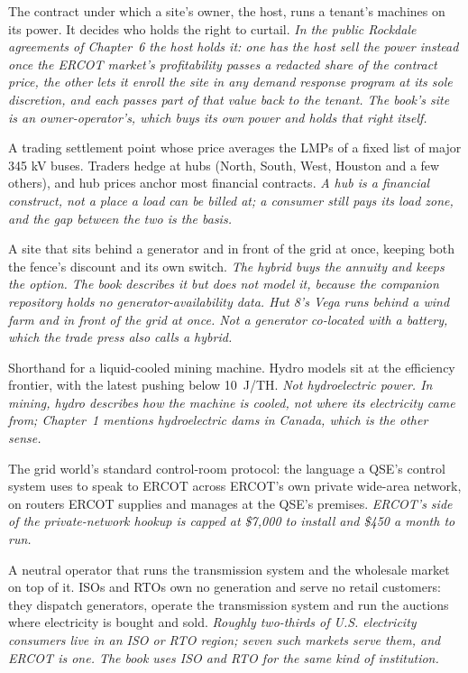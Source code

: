 \begin{description}[leftmargin=0pt,style=unboxed,itemsep=0.35em,parsep=0.15em]
\item[hosting agreement] \hypertarget{glossary:hosting-agreement}{}The contract under which a site's owner, the host, runs a tenant's machines on its power. It decides who holds the right to curtail. \emph{In the public Rockdale agreements of Chapter~6 the host holds it: one has the host sell the power instead once the ERCOT market's profitability passes a redacted share of the contract price, the other lets it enroll the site in any demand response program at its sole discretion, and each passes part of that value back to the tenant. The book's site is an owner-operator's, which buys its own power and holds that right itself.}
\item[hub] \hypertarget{glossary:hub}{}A trading settlement point whose price averages the LMPs of a fixed list of major 345 kV buses. Traders hedge at hubs (North, South, West, Houston and a few others), and hub prices anchor most financial contracts. \emph{A hub is a financial construct, not a place a load can be billed at; a consumer still pays its load zone, and the gap between the two is the basis.}
\item[hybrid] \hypertarget{glossary:hybrid}{}A site that sits behind a generator and in front of the grid at once, keeping both the fence's discount and its own switch. \emph{The hybrid buys the annuity and keeps the option. The book describes it but does not model it, because the companion repository holds no generator-availability data. Hut 8's Vega runs behind a wind farm and in front of the grid at once. Not a generator co-located with a battery, which the trade press also calls a hybrid.}
\item[hydro] \hypertarget{glossary:hydro}{}Shorthand for a liquid-cooled mining machine. Hydro models sit at the efficiency frontier, with the latest pushing below 10~J/TH. \emph{Not hydroelectric power. In mining, hydro describes how the machine is cooled, not where its electricity came from; Chapter~1 mentions hydroelectric dams in Canada, which is the other sense.}
\item[ICCP] \hypertarget{glossary:iccp}{}The grid world's standard control-room protocol: the language a QSE's control system uses to speak to ERCOT across ERCOT's own private wide-area network, on routers ERCOT supplies and manages at the QSE's premises. \emph{ERCOT's side of the private-network hookup is capped at \$7,000 to install and \$450 a month to run.}
\item[Independent System Operator (ISO)] \hypertarget{glossary:independent-system-operator}{}A neutral operator that runs the transmission system and the wholesale market on top of it. ISOs and RTOs own no generation and serve no retail customers: they dispatch generators, operate the transmission system and run the auctions where electricity is bought and sold. \emph{Roughly two-thirds of U.S. electricity consumers live in an ISO or RTO region; seven such markets serve them, and ERCOT is one. The book uses ISO and RTO for the same kind of institution.}

\end{description}
